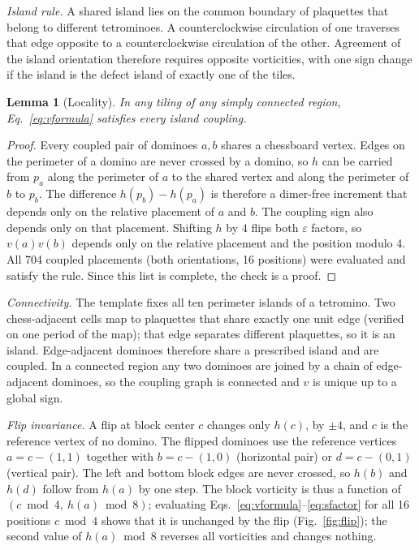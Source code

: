 \documentclass[aps,prb,twocolumn,floatfix,longbibliography]{revtex4-2}
\newtheorem{lemma}{Lemma}
\newcommand{\eps}{\varepsilon}
\begin{document}
\emph{Island rule.} A shared island lies on the common boundary of plaquettes that belong to different tetrominoes. A counterclockwise circulation of one traverses that edge opposite to a counterclockwise circulation of the other. Agreement of the island orientation therefore requires opposite vorticities, with one sign change if the island is the defect island of exactly one of the tiles.

\begin{lemma}[Locality]\label{lem:local}
In any tiling of any simply connected region, Eq.~\eqref{eq:vformula} satisfies every island coupling.
\end{lemma}
\begin{proof}
Every coupled pair of dominoes $a,b$ shares a chessboard vertex. Edges on the perimeter of a domino are never crossed by a domino, so $h$ can be carried from $p_a$ along the perimeter of $a$ to the shared vertex and along the perimeter of $b$ to $p_b$. The difference $h(p_b)-h(p_a)$ is therefore a dimer-free increment that depends only on the relative placement of $a$ and $b$. The coupling sign also depends only on that placement. Shifting $h$ by 4 flips both $\eps$ factors, so $v(a)v(b)$ depends only on the relative placement and the position modulo 4. All 704 coupled placements (both orientations, 16 positions) were evaluated and satisfy the rule. Since this list is complete, the check is a proof.
\end{proof}

\emph{Connectivity.} The template fixes all ten perimeter islands of a tetromino. Two chess-adjacent cells map to plaquettes that share exactly one unit edge (verified on one period of the map); that edge separates different plaquettes, so it is an island. Edge-adjacent dominoes therefore share a prescribed island and are coupled. In a connected region any two dominoes are joined by a chain of edge-adjacent dominoes, so the coupling graph is connected and $v$ is unique up to a global sign.

\emph{Flip invariance.} A flip at block center $c$ changes only $h(c)$, by $\pm4$, and $c$ is the reference vertex of no domino. The flipped dominoes use the reference vertices $a=c-(1,1)$ together with $b=c-(1,0)$ (horizontal pair) or $d=c-(0,1)$ (vertical pair). The left and bottom block edges are never crossed, so $h(b)$ and $h(d)$ follow from $h(a)$ by one step. The block vorticity is thus a function of $(c\bmod4,\ h(a)\bmod8)$; evaluating Eqs.~\eqref{eq:vformula}--\eqref{eq:sfactor} for all 16 positions $c\bmod4$ shows that it is unchanged by the flip (Fig.~\ref{fig:flip}); the second value of $h(a)\bmod8$ reverses all vorticities and changes nothing.
\end{document}
